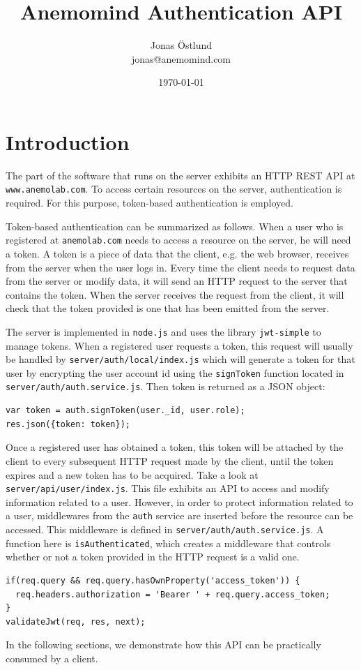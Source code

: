 \documentclass{article}
\author{Jonas Östlund\\jonas@anemomind.com}
\date{\today}
\title{Anemomind Authentication API}
\begin{document}
\maketitle
\section{Introduction}
The part of the software that runs on the server exhibits
an HTTP REST API at \texttt{www.anemolab.com}. To access certain resources
on the server, authentication is required. For this purpose, token-based
authentication is employed.

Token-based authentication can be summarized as follows. When a user who is registered at \texttt{anemolab.com} needs to access a resource on the server, he will need a token. A token is a piece of data that the client, e.g. the web browser, receives from the server when the user logs in. Every time the client needs to request data from the server or modify data, it will send an HTTP request to the server that contains the token. When the server receives the request from the client, it will check that the token provided is one that has been emitted from the server.

The server is implemented in \texttt{node.js} and uses the library \texttt{jwt-simple} to manage tokens. When a registered user requests a token, this request will usually be handled by \texttt{server/auth/local/index.js} which will generate a token for that user by encrypting the user account id using the \texttt{signToken} function located in \texttt{server/auth/auth.service.js}. Then token is returned as a JSON object:
\begin{verbatim}
var token = auth.signToken(user._id, user.role);
res.json({token: token});
\end{verbatim}
Once a registered user has obtained a token, this token will be attached by the client to every subsequent HTTP request made by the client, until the token expires and a new token has to be acquired. Take a look at \texttt{server/api/user/index.js}. This file exhibits an API to access and modify information related to a user. However, in order to protect information related to a user, middlewares from the \texttt{auth} service are inserted before the resource can be accessed. This middleware is defined in \texttt{server/auth/auth.service.js}. A function here is \texttt{isAuthenticated}, which creates a middleware that controls whether or not a token provided in the HTTP request is a valid one.

\begin{verbatim}
if(req.query && req.query.hasOwnProperty('access_token')) {
  req.headers.authorization = 'Bearer ' + req.query.access_token;
}
validateJwt(req, res, next);
\end{verbatim}
In the following sections, we demonstrate how this API can be practically consumed by a client.
\end{document}
